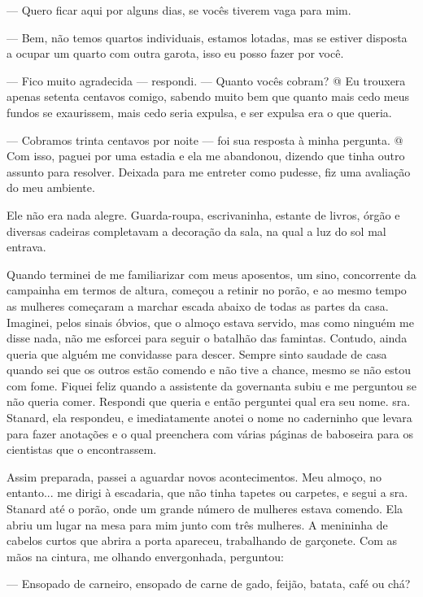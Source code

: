 --- Quero ficar aqui por alguns dias, se vocês tiverem vaga para mim.

--- Bem, não temos quartos individuais, estamos lotadas, mas se estiver
disposta a ocupar um quarto com outra garota, isso eu posso fazer por
você.

--- Fico muito agradecida --- respondi. --- Quanto vocês cobram? @ Eu
trouxera apenas setenta centavos comigo, sabendo muito bem que quanto
mais cedo meus fundos se exaurissem, mais cedo seria expulsa, e ser
expulsa era o que queria.

--- Cobramos trinta centavos por noite --- foi sua resposta à minha
pergunta. @ Com isso, paguei por uma estadia e ela me abandonou, dizendo
que tinha outro assunto para resolver. Deixada para me entreter como
pudesse, fiz uma avaliação do meu ambiente.

Ele não era nada alegre. Guarda-roupa, escrivaninha, estante de livros,
órgão e diversas cadeiras completavam a decoração da sala, na qual a luz
do sol mal entrava.

Quando terminei de me familiarizar com meus aposentos, um sino,
concorrente da campainha em termos de altura, começou a retinir no
porão, e ao mesmo tempo as mulheres começaram a marchar escada abaixo de
todas as partes da casa. Imaginei, pelos sinais óbvios, que o almoço
estava servido, mas como ninguém me disse nada, não me esforcei para
seguir o batalhão das famintas. Contudo, ainda queria que alguém me
convidasse para descer. Sempre sinto saudade de casa quando sei que os
outros estão comendo e não tive a chance, mesmo se não estou com fome.
Fiquei feliz quando a assistente da governanta subiu e me perguntou se
não queria comer. Respondi que queria e então perguntei qual era seu
nome. sra. Stanard, ela respondeu, e imediatamente anotei o nome no
caderninho que levara para fazer anotações e o qual preenchera com
várias páginas de baboseira para os cientistas que o encontrassem.

Assim preparada, passei a aguardar novos acontecimentos. Meu almoço, no
entanto... me dirigi à escadaria, que não tinha tapetes ou carpetes, e
segui a sra. Stanard até o porão, onde um grande número de mulheres
estava comendo. Ela abriu um lugar na mesa para mim junto com três
mulheres. A menininha de cabelos curtos que abrira a porta apareceu,
trabalhando de garçonete. Com as mãos na cintura, me olhando
envergonhada, perguntou:

--- Ensopado de carneiro, ensopado de carne de gado, feijão, batata,
café ou chá?

